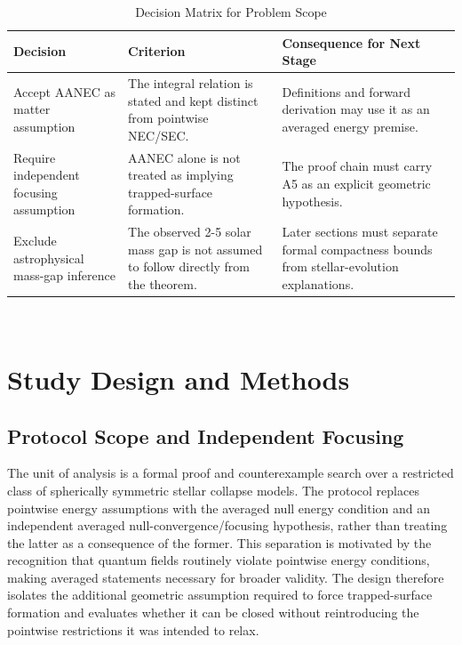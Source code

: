 \documentclass[conference]{IEEEtran}
\begin{document}
\begin{table}[htbp]
\centering
\footnotesize
\setlength{\tabcolsep}{3pt}
\renewcommand{\arraystretch}{1.12}
\caption{Decision Matrix for Problem Scope}
\label{tab:formal-problem-and-hypotheses-fp-06}
\begin{tabular}{|p{}|p{}|p{}|}
\hline
Decision & Criterion & Consequence for Next Stage \\\hline
Accept AANEC as matter assumption & The integral relation is stated and kept distinct from pointwise NEC/SEC. & Definitions and forward derivation may use it as an averaged energy premise. \\\hline
Require independent focusing assumption & AANEC alone is not treated as implying trapped-surface formation. & The proof chain must carry A5 as an explicit geometric hypothesis. \\\hline
Exclude astrophysical mass-gap inference & The observed 2-5 solar mass gap is not assumed to follow directly from the theorem. & Later sections must separate formal compactness bounds from stellar-evolution explanations. \\\hline
\end{tabular}
\end{table}~\cite{cite_72d7ff391b29c495,cite_7a407c865faafd11,cite_7a44e6730c44cb39,cite_cbbced417410bc6c,cite_f634820e22d7a238,cite_fd0f77b2a173c0ab}

\section{Study Design and Methods}
\subsection{Protocol Scope and Independent Focusing}
The unit of analysis is a formal proof and counterexample search over a restricted class of spherically symmetric stellar collapse models. The protocol replaces pointwise energy assumptions with the averaged null energy condition and an independent averaged null-convergence/focusing hypothesis, rather than treating the latter as a consequence of the former. This separation is motivated by the recognition that quantum fields routinely violate pointwise energy conditions, making averaged statements necessary for broader validity. The design therefore isolates the additional geometric assumption required to force trapped-surface formation and evaluates whether it can be closed without reintroducing the pointwise restrictions it was intended to relax.~\cite{cite_0ed84243cf171bc4}
\end{document}

